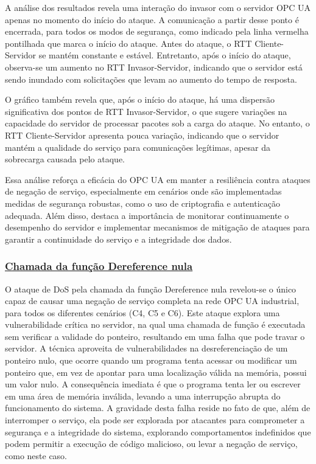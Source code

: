 A análise dos resultados revela uma interação do invasor com o servidor OPC UA apenas no momento do início do ataque. A comunicação a partir desse ponto é encerrada, para todos os modos de segurança, como indicado pela linha vermelha pontilhada que marca o início do ataque. Antes do ataque, o RTT Cliente-Servidor se mantém constante e estável. Entretanto, após o início do ataque, observa-se um aumento no RTT Invasor-Servidor, indicando que o servidor está sendo inundado com solicitações que levam ao aumento do tempo de resposta.

O gráfico também revela que, após o início do ataque, há uma dispersão significativa dos pontos de RTT Invasor-Servidor, o que sugere variações na capacidade do servidor de processar pacotes sob a carga do ataque. No entanto, o RTT Cliente-Servidor apresenta pouca variação, indicando que o servidor mantém a qualidade do serviço para comunicações legítimas, apesar da sobrecarga causada pelo ataque.

Essa análise reforça a eficácia do OPC UA em manter a resiliência contra ataques de negação de serviço, especialmente em cenários onde são implementadas medidas de segurança robustas, como o uso de criptografia e autenticação adequada. Além disso, destaca a importância de monitorar continuamente o desempenho do servidor e implementar mecanismos de mitigação de ataques para garantir a continuidade do serviço e a integridade dos dados. 

\subsubsection*{\underline{Chamada da função Dereference nula}}

O ataque de DoS pela chamada da função Dereference nula revelou-se o único capaz de causar uma negação de serviço completa na rede OPC UA industrial, para todos os diferentes cenários (C4, C5 e C6). Este ataque explora uma vulnerabilidade crítica no servidor, na qual uma chamada de função é executada sem verificar a validade do ponteiro, resultando em uma falha que pode travar o servidor. A técnica aproveita de vulnerabilidades na desreferenciação de um ponteiro nulo, que ocorre quando um programa tenta acessar ou modificar um ponteiro que, em vez de apontar para uma localização válida na memória, possui um valor nulo. A consequência imediata é que o programa tenta ler ou escrever em uma área de memória inválida, levando a uma interrupção abrupta do funcionamento do sistema. A gravidade desta falha reside no fato de que, além de interromper o serviço, ela pode ser explorada por atacantes para comprometer a segurança e a integridade do sistema, explorando comportamentos indefinidos que podem permitir a execução de código malicioso, ou levar a negação de serviço, como neste caso.


